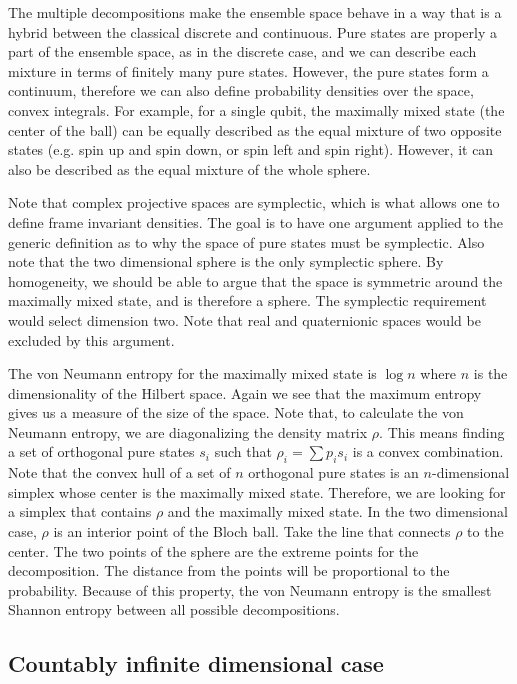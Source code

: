 The multiple decompositions make the ensemble space behave in a way that is a hybrid between the classical discrete and continuous. Pure states are properly a part of the ensemble space, as in the discrete case, and we can describe each mixture in terms of finitely many pure states. However, the pure states form a continuum, therefore we can also define probability densities over the space, convex integrals. For example, for a single qubit, the maximally mixed state (the center of the ball) can be equally described as the equal mixture of two opposite states (e.g. spin up and spin down, or spin left and spin right). However, it can also be described as the equal mixture of the whole sphere.

Note that complex projective spaces are symplectic, which is what allows one to define frame invariant densities. The goal is to have one argument applied to the generic definition as to why the space of pure states must be symplectic. Also note that the two dimensional sphere is the only symplectic sphere. By homogeneity, we should be able to argue that the space is symmetric around the maximally mixed state, and is therefore a sphere. The symplectic requirement would select dimension two. Note that real and quaternionic spaces would be excluded by this argument.

The von Neumann entropy for the maximally mixed state is $\log n$ where $n$ is the dimensionality of the Hilbert space. Again we see that the maximum entropy gives us a measure of the size of the space. Note that, to calculate the von Neumann entropy, we are diagonalizing the density matrix $\rho$. This means finding a set of orthogonal pure states $s_i$ such that $\rho_i = \sum p_i s_i$ is a convex combination. Note that the convex hull of a set of $n$ orthogonal pure states is an $n$-dimensional simplex whose center is the maximally mixed state. Therefore, we are looking for a simplex that contains $\rho$ and the maximally mixed state. In the two dimensional case, $\rho$ is an interior point of the Bloch ball. Take the line that connects $\rho$ to the center. The two points of the sphere are the extreme points for the decomposition. The distance from the points will be proportional to the probability. Because of this property, the von Neumann entropy is the smallest Shannon entropy between all possible decompositions.


\subsection{Countably infinite dimensional case}

